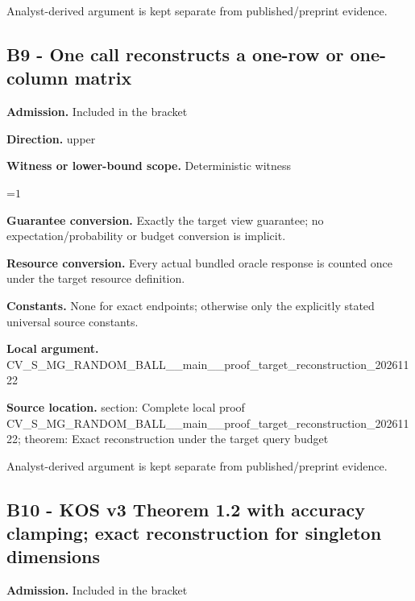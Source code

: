 \documentclass[10pt,a4paper]{article}
\newcommand{\AtlasMath}[1]{\par\begingroup\centering\setbox0=\hbox{$\displaystyle #1$}\ifdim\wd0>1.4\linewidth\typeout{ATLAS WIDE FORMULA: \the\wd0}\fi\ifdim\wd0>\linewidth\resizebox{\linewidth}{!}{\box0}\else\box0\fi\par\endgroup}
\begin{document}
Analyst-derived argument is kept separate from published/preprint evidence.



\subsection{B9 - One call reconstructs a one-row or one-column matrix}


\textbf{Admission.} Included in the bracket



\textbf{Direction.} upper



\textbf{Witness or lower-bound scope.} Deterministic witness



\AtlasMath{1}


\textbf{Guarantee conversion.} Exactly the target view guarantee; no expectation/probability or budget conversion is implicit.



\textbf{Resource conversion.} Every actual bundled oracle response is counted once under the target resource definition.



\textbf{Constants.} None for exact endpoints; otherwise only the explicitly stated universal source constants.



\textbf{Local argument.} CV\_S\_MG\_RANDOM\_BALL\_\_mai\allowbreak{}n\_\_proof\_target\_reconstr\allowbreak{}uction\_20261122



\textbf{Source location.}  section: Complete local proof CV\_S\_MG\_RANDOM\_BALL\_\_mai\allowbreak{}n\_\_proof\_target\_reconstr\allowbreak{}uction\_20261122; theorem: Exact reconstruction under the target query budget



Analyst-derived argument is kept separate from published/preprint evidence.



\subsection{B10 - KOS v3 Theorem 1.2 with accuracy clamping; exact reconstruction for singleton dimensions}


\textbf{Admission.} Included in the bracket
\end{document}
